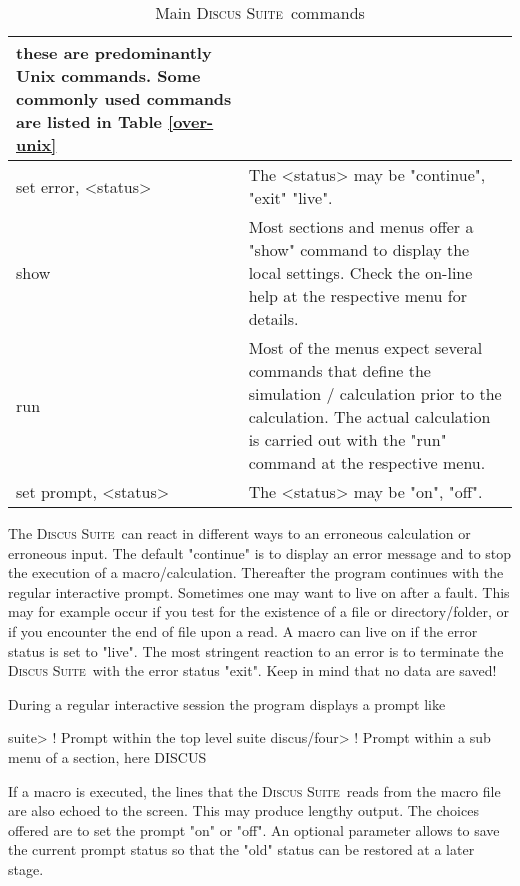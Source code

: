 \documentclass[11pt]{report}
\newcommand{\Suite}{\textsc{Discus Suite\ }}
\begin{document}
\begin{table}[!tbh]
\begin{tabularx}{\textwidth}{|p{50mm}|X|}
          these are predominantly Unix commands. Some 
          commonly used commands are listed in Table
          \ref{over-unix}\\
  \hline
   set error, <status> & The <status> may be "continue", 
          "exit" "live".\\
  \hline
   show  & Most sections and menus offer a "show" command
           to display the local settings. Check the on-line
           help at the respective menu for details.\\
  \hline
   run   & Most of the menus expect several commands that
           define the simulation / calculation prior to the
           calculation. The actual 
           calculation is carried out with the "run" command
           at the respective menu.\\
  \hline
   set prompt, <status> & The <status> may be "on", "off".\\
  \hline
\end{tabularx}
\caption{\label{over-cmds}Main \Suite commands}
\end{table}

The \Suite can react in different ways to an erroneous calculation or 
erroneous input. The default "continue" is to display an error message 
and to stop the execution of a macro/calculation. Thereafter the program 
continues with the regular interactive prompt. Sometimes one may
want to live on after a fault. This may for example occur if you test
for the existence of a file or directory/folder, or if you encounter 
the end of file upon a read. A macro can live on if the error status is
set to "live". The most stringent reaction to an error is to terminate
the  \Suite with the error status "exit". Keep in mind that no data are
saved!

During a regular interactive session the program displays a prompt like
\begin{MacVerbatim}
suite>         ! Prompt within the top level suite
discus/four>   ! Prompt within a sub menu of a section, here DISCUS
\end{MacVerbatim}
If a macro is executed, the lines that the \Suite reads from the macro
file are also echoed to the screen. This may produce lengthy output.
The choices offered are to set the prompt "on" or "off". An optional
parameter allows to save the current prompt status so that the "old" 
status can be restored at a later stage.
\end{document}
